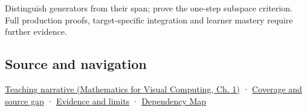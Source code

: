 Distinguish generators from their span; prove the one-step subspace criterion. Full production proofs, target-specific integration and learner mastery require further evidence.

\subsection{Source and navigation}\label{appendix-173b52c063ae-source-and-navigation}

\href{../02-Mathematics-for-Visual-Computing/main.pdf\#nameddest=01-foundations-i-ch017-the-reachable-movements-form-a-vector-space}{Teaching narrative (Mathematics for Visual Computing, Ch. 1)} · \hyperref[appendix-fd090d982a15-phase-6---parts-501-600]{Coverage and source gap} · \hyperref[appendix-a103e7846d21-phase-6---source-analysis-and-verification]{Evidence and limits} · \hyperref[appendix-4ad47bdd269a]{Dependency Map}
